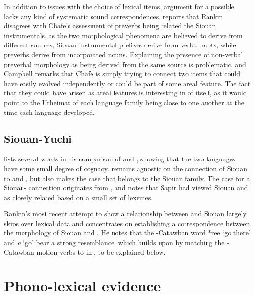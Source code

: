 \documentclass[output=paper]{LSP/langsci}
\begin{document}
\newpage
In addition to issues with the choice of lexical items,  argument for a possible  lacks any kind of systematic sound correspondences. \citet{Campbell2000} reports that Rankin disagrees with Chafe's assessment of  preverbs being related the Siouan instrumentals, as the two morphological phenomena are believed to derive from different sources; Siouan instrumental prefixes derive from verbal roots, while  preverbs derive from incorporated nouns. Explaining the presence of non-verbal preverbal morphology as being derived from the same source is problematic, and Campbell remarks that Chafe is simply trying to connect two items that could have easily evolved independently or could be part of some areal feature. The fact that they could have arisen as areal features is interesting in of itself, as it would point to the Urheimat of each language family being close to one another at the time each language developed.

\subsection{Siouan-Yuchi}

\citet{Carter1980} lists several  words in his comparison of  and , showing that the two languages have some small degree of cognacy. \citet{Rankin1996,Rankin1998scy} remains agnostic on the connection of Siouan to  and , but also makes the case that  belongs to the Siouan family. The case for a Siouan- connection originates from \citet{Sapir1929}, and \citet{Haas1952} notes that Sapir had viewed Siouan and  as closely related based on a small set of lexemes.

Rankin's \citeyear{Rankin1998scy} most recent attempt to show a relationship between  and Siouan largely skips over lexical data and concentrates on establishing a correspondence between the morphology of Siouan and . He notes that the -Catawban word *ree `go there' and  \emph{\textbeltl a} `go' bear a strong resemblance, which \citet{Kasak2012,Kasak2013} builds upon by matching the -Catawban motion verbs to  in , to be explained below.

\section{Phono-lexical evidence}\label{sec:kasak:4}
\end{document}
